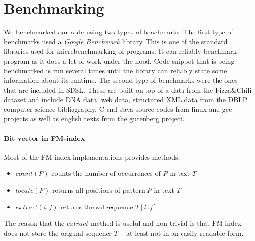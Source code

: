 \section{Benchmarking}

We benchmarked our code using two types of benchmarks. The first type of benchmarks used
a \textit{Google Benchmark} library. This is one of the standard libraries used for
microbenchmarking of programs. It can reliably benchmark program as it does a lot of work
under the hood. Code snippet that is being benchmarked is run several times until the
library can reliably state some information about its runtime. The second type of benchmarks
were the ones that are included in SDSL. These are built on top of a data from the
Pizza\&Chili dataset \citep{ferragina2005pizza} and include DNA data, web data, structured
XML data from the DBLP computer science bibliography, C and Java source codes from linux
and gcc projects as well as english texts from the gutenberg project.

\paragraph{Bit vector in FM-index}
Most of the FM-index implementations provides methods:
\begin{itemize}
	\item $\mathit{count}(P)$ counts the number of occurrences of $P$ in text $T$
	\item $\mathit{locate}(P)$ returns all positions of pattern $P$ in text $T$
	\item $\mathit{extract}(i, j)$ returns the subsequence $T[i..j]$
\end{itemize}
The reason that the $\mathit{extract}$ method is useful and non-trivial is that FM-index
does not store the original sequence $T$ -- at least not in an easily readable form.